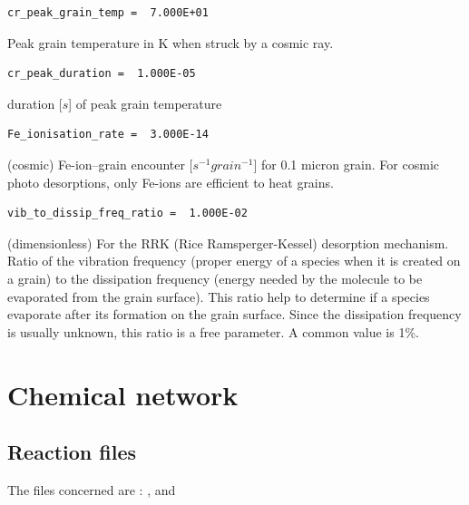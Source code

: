 \documentclass[english,a4paper,twoside]{article}
\begin{document}
\begin{verbatim}
cr_peak_grain_temp =  7.000E+01
\end{verbatim}
Peak grain temperature in K when struck by a cosmic ray.

\begin{verbatim}
cr_peak_duration =  1.000E-05
\end{verbatim}
duration [$\unit{s}$] of peak grain temperature

\begin{verbatim}
Fe_ionisation_rate =  3.000E-14
\end{verbatim}
(cosmic) Fe-ion--grain encounter [$\unit{s^{-1} grain^{-1}}$] for 0.1 micron grain. For cosmic photo desorptions, only Fe-ions are efficient to heat grains. 

\begin{verbatim}
vib_to_dissip_freq_ratio =  1.000E-02
\end{verbatim}
(dimensionless) For the RRK (Rice Ramsperger-Kessel) desorption mechanism. Ratio of the vibration frequency (proper energy of a species when it is created on a grain) to the dissipation frequency (energy needed by the molecule to be evaporated from the grain surface). This ratio help to determine if a species evaporate after its formation on the grain surface. Since the dissipation frequency is usually unknown, this ratio is a free parameter. A common value is 1\%.

\section{Chemical network}\label{sec:chemical-network}
\subsection{Reaction files}
The files concerned are : ,  and 
\end{document}
